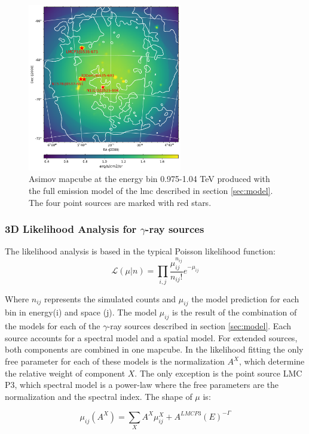 \documentclass{article}
\begin{document}
\begin{figure}
  \centering
  \includegraphics[width=0.6\textwidth]{Pictures/Asimov_0-975_1-04TeVmap.pdf}
  \caption{\label{fig:asimov} Asimov mapcube at the energy bin 0.975-1.04 TeV produced with the full emission model of the \gls{lmc} described in section \ref{sec:model}. The four point sources are marked with red stars.  }
\end{figure}
\subsubsection{3D Likelihood Analysis for $\gamma$-ray sources}
The likelihood analysis is based in the typical Poisson likelihood function:
\begin{equation}
  \mathcal{L}(\mu | n) = \prod_{i,j}\frac{\mu_{ij}^{n_{ij}}}{n_{ij}!}e^{-\mu_{ij}}
  \label{eq:likelihood}
\end{equation}

Where $n_{ij}$ represents the simulated counts and $\mu_{ij}$ the model prediction for each bin in energy(i) and space (j). The model $\mu_{ij}$ is the result of the combination of the models for each of the $\gamma$-ray sources described in section \ref{sec:model}. Each source accounts for a spectral model and a spatial model. For extended sources, both components are combined in one mapcube. In the likelihood fitting the only free parameter for each of these models is the normalization $A^{X}$, which determine the relative weight of component $X$. The only exception is the point source LMC P3, which spectral model is a power-law where the free parameters are the normalization and the spectral index. The shape of $\mu$ is:

\begin{equation}
  \mu_{ij}(A^{X}) = \sum_{X} A^{X} \mu^{X}_{ij} + A^{LMC P3}(E)^{-\Gamma}
\end{equation}
\end{document}
